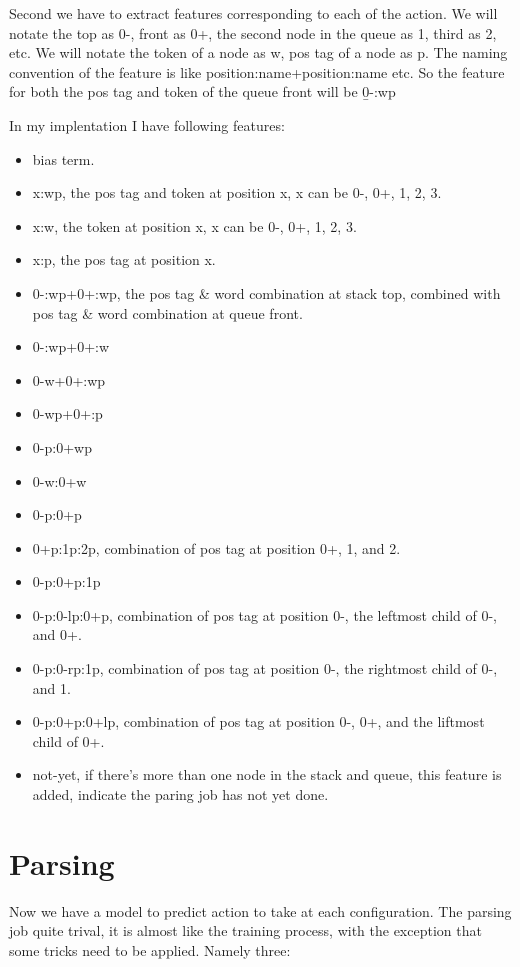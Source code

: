 \documentclass[11pt]{article}
\begin{document}
Second we have to extract features corresponding to each of the action. We will notate the top as 0-, front as 0+, the second node in the queue as 1, third as 2, etc. We will notate the token of a node as w, pos tag of a node as p. The naming convention of the feature is like position:name+position:name etc. So the feature for both the pos tag and token of the queue front will be \b{0-:wp}

In my implentation I have following features:

\begin{itemize}
\item bias term.
\item x:wp, the pos tag and token at position x, x can be 0-, 0+, 1, 2, 3.
\item x:w, the token at position x, x can be 0-, 0+, 1, 2, 3.
\item x:p, the pos tag at position x.
\item 0-:wp+0+:wp, the pos tag \& word combination at stack top, combined with pos tag \& word combination at queue front.
\item 0-:wp+0+:w
\item 0-w+0+:wp
\item 0-wp+0+:p
\item 0-p:0+wp
\item 0-w:0+w
\item 0-p:0+p
\item 0+p:1p:2p, combination of pos tag at position 0+, 1, and 2.
\item 0-p:0+p:1p
\item 0-p:0-lp:0+p, combination of pos tag at position 0-, the leftmost child of 0-, and 0+.
\item 0-p:0-rp:1p, combination of pos tag at position 0-, the rightmost child of 0-, and 1.
\item 0-p:0+p:0+lp, combination of pos tag at position 0-, 0+, and the liftmost child of 0+. 
\item not-yet, if there's more than one node in the stack and queue, this feature is added, indicate the paring job has not yet done.
\end{itemize}

\section{Parsing}

Now we have a model to predict action to take at each configuration. The parsing job quite trival, it is almost like the training process, with the exception that some tricks need to be applied. Namely three:
\end{document}
